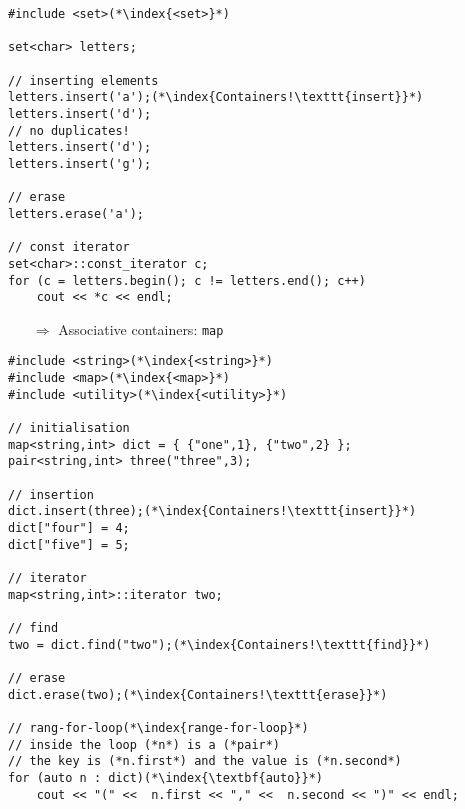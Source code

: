 \documentclass[10pt]{article}
\begin{document}
\begin{lstlisting}
#include <set>(*\index{<set>}*)

set<char> letters;

// inserting elements    
letters.insert('a');(*\index{Containers!\texttt{insert}}*)
letters.insert('d');
// no duplicates!
letters.insert('d');
letters.insert('g');

// erase    
letters.erase('a');

// const iterator 
set<char>::const_iterator c;   
for (c = letters.begin(); c != letters.end(); c++)
    cout << *c << endl;
\end{lstlisting}
\begin{enumerate}
\item[$\Rightarrow$] Associative containers: \texttt{map}
\end{enumerate}
\begin{lstlisting}
#include <string>(*\index{<string>}*)
#include <map>(*\index{<map>}*)
#include <utility>(*\index{<utility>}*)

// initialisation
map<string,int> dict = { {"one",1}, {"two",2} };
pair<string,int> three("three",3);

// insertion    
dict.insert(three);(*\index{Containers!\texttt{insert}}*)
dict["four"] = 4;
dict["five"] = 5;

// iterator    
map<string,int>::iterator two;

// find    
two = dict.find("two");(*\index{Containers!\texttt{find}}*)

// erase    
dict.erase(two);(*\index{Containers!\texttt{erase}}*)

// rang-for-loop(*\index{range-for-loop}*)
// inside the loop (*n*) is a (*pair*)
// the key is (*n.first*) and the value is (*n.second*)
for (auto n : dict)(*\index{\textbf{auto}}*)
    cout << "(" <<  n.first << "," <<  n.second << ")" << endl;
\end{lstlisting}
%
%
\end{document}
